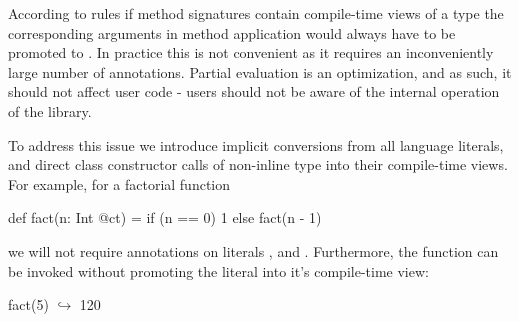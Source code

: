 According to \calculus rules if method signatures contain compile-time views of a type
 the corresponding arguments in method application would always have to be promoted to .
 In practice this is not convenient as it requires an inconveniently large number
 of annotations. Partial evaluation is an optimization, and as such, it should not
 affect user code - users should not be aware of the internal operation of the library.

To address this issue we introduce implicit conversions from all language literals, and
 direct class constructor calls of non-inline type into their compile-time views.
 For example, for a factorial function \begin{lstparagraph}
def fact(n: Int @ct) = if (n == 0) 1 else fact(n - 1)
 \end{lstparagraph} we will not require annotations on literals , and . Furthermore,
 the function can be invoked without promoting the literal  into it's compile-time view:\begin{lstparagraph}
fact(5)
  $\hookrightarrow$ 120
 \end{lstparagraph}
